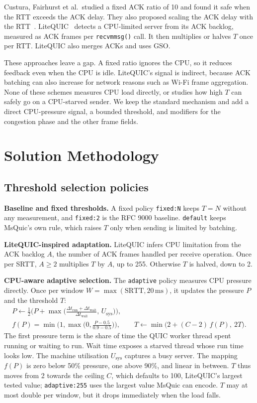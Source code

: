 \documentclass[11pt]{article}
\newcommand{\pol}[1]{\texttt{#1}}            %
\newcommand{\para}[1]{\textbf{#1}} %
\begin{document}
Custura, Fairhurst et al.\ studied a fixed ACK ratio of 10 and found it safe when the RTT exceeds
the ACK delay. They also proposed scaling the ACK delay with the RTT~\cite{custura2023ackfreq}.
LiteQUIC~\cite{bi2024litequic} detects a CPU-limited server from its ACK backlog, measured as ACK
frames per \pol{recvmmsg()} call. It then multiplies or halves $T$ once per RTT. LiteQUIC also
merges ACKs and uses GSO.

These approaches leave a gap. A fixed ratio ignores the CPU, so it reduces feedback even when the
CPU is idle. LiteQUIC's signal is indirect, because ACK batching can also increase
for network reasons such as Wi-Fi frame aggregation. None of these schemes measures CPU load
directly, or studies how high $T$ can safely go on a CPU-starved sender. We keep the standard
mechanism and add a direct CPU-pressure signal, a bounded threshold, and modifiers for the
congestion phase and the other frame fields.

\section{Solution Methodology}\label{sec:method}
\subsection{Threshold selection policies}
\para{Baseline and fixed thresholds.} A fixed policy \pol{fixed:N} keeps $T{=}N$ without any
measurement, and \pol{fixed:2} is the RFC 9000 baseline. \pol{default} keeps MsQuic's own rule,
which raises $T$ only when sending is limited by batching.

\para{LiteQUIC-inspired adaptation.} LiteQUIC infers CPU limitation from the ACK backlog $A$, the
number of ACK frames handled per receive operation. Once per SRTT, $A \ge 2$ multiplies $T$ by
$A$, up to 255. Otherwise $T$ is halved, down to 2.

\para{CPU-aware adaptive selection.} The \pol{adaptive} policy measures CPU pressure directly.
Once per window $W = \max(\mathrm{SRTT}, 20\,\mathrm{ms})$, it updates the pressure $P$ and the
threshold $T$:
\begin{equation}
  \begin{gathered}
  P \leftarrow \tfrac{1}{2}\Big(P{+}\max\big(\tfrac{\Delta t_{\mathrm{run}}+\Delta t_{\mathrm{wait}}}{\Delta t_{\mathrm{wall}}},\, U_{\mathrm{sys}}\big)\Big),\\
  f(P) = \min\Big(1, \max\big(0, \tfrac{P-0.5}{0.9-0.5}\big)\Big),\qquad
  T \leftarrow \min\big(2{+}(C{-}2)\,f(P),\ 2T\big).
  \end{gathered}
\end{equation}
The first pressure term is the share of time the QUIC worker thread spent running or waiting to
run. Wait time exposes a starved thread whose run time looks low. The machine utilisation
$U_{\mathrm{sys}}$ captures a busy server. The mapping $f(P)$ is zero below 50\% pressure, one
above 90\%, and linear in between. $T$ thus moves from 2 towards the ceiling $C$, which defaults
to 100, LiteQUIC's largest tested value; \pol{adaptive:255} uses the largest value MsQuic can
encode. $T$ may at most double per window, but it drops immediately when the load falls.
\end{document}
